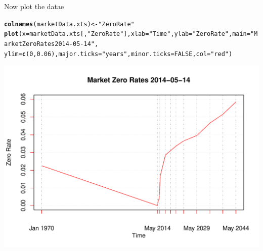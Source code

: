 \documentclass[12pt, a4paper, oneside]{article}\usepackage[]{graphicx}\usepackage[]{color}
\makeatletter
\def\maxwidth{ %
  \ifdim\Gin@nat@width>\linewidth
    \linewidth
  \else
    \Gin@nat@width
  \fi
}
\newcommand{\hlnum}[1]{\textcolor[rgb]{0.686,0.059,0.569}{#1}}%
\newcommand{\hlstr}[1]{\textcolor[rgb]{0.192,0.494,0.8}{#1}}%
\newcommand{\hlstd}[1]{\textcolor[rgb]{0.345,0.345,0.345}{#1}}%
\newcommand{\hlkwb}[1]{\textcolor[rgb]{0.69,0.353,0.396}{#1}}%
\newcommand{\hlkwc}[1]{\textcolor[rgb]{0.333,0.667,0.333}{#1}}%
\newcommand{\hlkwd}[1]{\textcolor[rgb]{0.737,0.353,0.396}{\textbf{#1}}}%
\newenvironment{kframe}{%
 \def\at@end@of@kframe{}%
 \ifinner\ifhmode%
  \def\at@end@of@kframe{\end{minipage}}%
  \begin{minipage}{\columnwidth}%
 \fi\fi%
 \def\FrameCommand##1{\hskip\@totalleftmargin \hskip-\fboxsep
 \colorbox{shadecolor}{##1}\hskip-\fboxsep
     \hskip-\linewidth \hskip-\@totalleftmargin \hskip\columnwidth}%
 \MakeFramed {\advance\hsize-\width
   \@totalleftmargin\z@ \linewidth\hsize
   \@setminipage}}%
 {\par\unskip\endMakeFramed%
 \at@end@of@kframe}
\newenvironment{knitrout}{}{} %
\makeatother
\begin{document}
Now plot the datae
\begin{knitrout}
\color{fgcolor}\begin{kframe}
\begin{alltt}
\hlkwd{colnames}\hlstd{(marketData.xts)} \hlkwb{<-} \hlstr{"ZeroRate"}
\hlkwd{plot}\hlstd{(}\hlkwc{x} \hlstd{= marketData.xts[,} \hlstr{"ZeroRate"}\hlstd{],} \hlkwc{xlab} \hlstd{=} \hlstr{"Time"}\hlstd{,} \hlkwc{ylab} \hlstd{=} \hlstr{"Zero Rate"}\hlstd{,} \hlkwc{main} \hlstd{=} \hlstr{"Market Zero Rates 2014-05-14"}\hlstd{,}
    \hlkwc{ylim} \hlstd{=} \hlkwd{c}\hlstd{(}\hlnum{0}\hlstd{,} \hlnum{0.06}\hlstd{),} \hlkwc{major.ticks} \hlstd{=} \hlstr{"years"}\hlstd{,} \hlkwc{minor.ticks} \hlstd{=} \hlnum{FALSE}\hlstd{,} \hlkwc{col} \hlstd{=} \hlstr{"red"}\hlstd{)}
\end{alltt}
\end{kframe}
\includegraphics[width=\maxwidth]{figure/plot} 

\end{knitrout}
\end{document}
